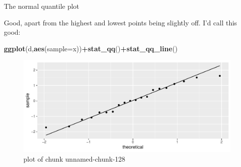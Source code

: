 \documentclass[ignorenonframetext,]{beamer}
\newenvironment{Shaded}{\begin{snugshade}}{\end{snugshade}}
\newcommand{\DataTypeTok}[1]{\textcolor[rgb]{0.13,0.29,0.53}{#1}}
\newcommand{\KeywordTok}[1]{\textcolor[rgb]{0.13,0.29,0.53}{\textbf{#1}}}
\newcommand{\NormalTok}[1]{#1}
\newcommand{\OperatorTok}[1]{\textcolor[rgb]{0.81,0.36,0.00}{\textbf{#1}}}
\begin{document}
\begin{frame}[fragile]{The normal quantile plot}
\protect\hypertarget{the-normal-quantile-plot-2}{}

Good, apart from the highest and lowest points being slightly off. I'd
call this good:

\begin{Shaded}
\begin{Highlighting}[]
\KeywordTok{ggplot}\NormalTok{(d,}\KeywordTok{aes}\NormalTok{(}\DataTypeTok{sample=}\NormalTok{x))}\OperatorTok{+}\KeywordTok{stat_qq}\NormalTok{()}\OperatorTok{+}\KeywordTok{stat_qq_line}\NormalTok{()}
\end{Highlighting}
\end{Shaded}

\begin{figure}
\centering
\includegraphics{figure/unnamed-chunk-128-1.pdf}
\caption{plot of chunk unnamed-chunk-128}
\end{figure}

\end{frame}
\end{document}
